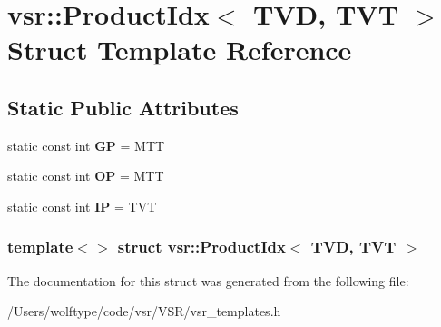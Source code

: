 \hypertarget{structvsr_1_1_product_idx_3_01_t_v_d_00_01_t_v_t_01_4}{\section{vsr\-:\-:Product\-Idx$<$ T\-V\-D, T\-V\-T $>$ Struct Template Reference}
\label{structvsr_1_1_product_idx_3_01_t_v_d_00_01_t_v_t_01_4}
}
\subsection*{Static Public Attributes}
\begin{DoxyCompactItemize}
\item 
\hypertarget{structvsr_1_1_product_idx_3_01_t_v_d_00_01_t_v_t_01_4_a5d870e7ed6d60f99eb3fef67a3d2df38}{static const int {\bfseries G\-P} = M\-T\-T}\label{structvsr_1_1_product_idx_3_01_t_v_d_00_01_t_v_t_01_4_a5d870e7ed6d60f99eb3fef67a3d2df38}

\item 
\hypertarget{structvsr_1_1_product_idx_3_01_t_v_d_00_01_t_v_t_01_4_ab8e1a7cd6517c97e72604a83fa8ca357}{static const int {\bfseries O\-P} = M\-T\-T}\label{structvsr_1_1_product_idx_3_01_t_v_d_00_01_t_v_t_01_4_ab8e1a7cd6517c97e72604a83fa8ca357}

\item 
\hypertarget{structvsr_1_1_product_idx_3_01_t_v_d_00_01_t_v_t_01_4_a2377600cb3cfd53786945c3c4fa339ec}{static const int {\bfseries I\-P} = T\-V\-T}\label{structvsr_1_1_product_idx_3_01_t_v_d_00_01_t_v_t_01_4_a2377600cb3cfd53786945c3c4fa339ec}

\end{DoxyCompactItemize}
\subsubsection*{template$<$$>$ struct vsr\-::\-Product\-Idx$<$ T\-V\-D, T\-V\-T $>$}



The documentation for this struct was generated from the following file\-:\begin{DoxyCompactItemize}
\item 
/\-Users/wolftype/code/vsr/\-V\-S\-R/vsr\-\_\-templates.\-h\end{DoxyCompactItemize}
